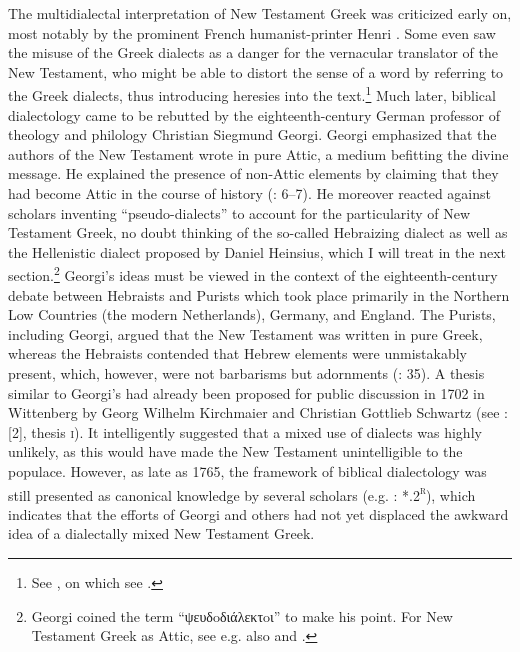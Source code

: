 The multidialectal interpretation of New Testament Greek was criticized early on, most notably by the prominent French humanist-printer Henri \citet[32–33, 138]{Estienne1581}. Some even saw the misuse of the Greek dialects as a danger for the vernacular translator of the New Testament, who might be able to distort the sense of a word by referring to the Greek dialects, thus introducing heresies into the text.\footnote{See \citet[429]{Rainolds1583}, on which see \citet[654--655]{VanRooyConsidine2016}.} Much later, biblical dialectology came to be rebutted by the eighteenth-century German professor of theology and philology Christian Siegmund Georgi. Georgi emphasized that the authors of the New Testament wrote in pure Attic, a medium befitting the divine message. He explained the presence of non-Attic elements by claiming that they had become Attic in the course of history (\citealt{Georgi1733}: 6–7). He moreover reacted against scholars inventing “pseudo-dialects” to account for the particularity of New Testament Greek, no doubt thinking of the so-called Hebraizing dialect as well as the Hellenistic dialect proposed by Daniel Heinsius, which I will treat in the next section.\footnote{Georgi coined the term “ψευδoδιάλεκτoι” to make his point. For New Testament Greek as Attic, see e.g. also \citet[3, 10--12]{Georgi1729} and \citet[b.7\textsc{\textsuperscript{r}}–b.8\textsc{\textsuperscript{v}}]{Fischer1754}.} Georgi’s ideas must be viewed in the context of the eighteenth-century debate between Hebraists and Purists which took place primarily in the Northern Low Countries (the modern Netherlands), Germany, and England. The Purists, including Georgi, argued that the New Testament was written in pure Greek, whereas the Hebraists contended that Hebrew elements were unmistakably present, which, however, were not barbarisms but adornments (: 35). A thesis similar to Georgi’s had already been proposed for public discussion in 1702 in Wittenberg by Georg Wilhelm Kirchmaier and Christian Gottlieb Schwartz (see \citealt{Kirchmaier1702}: [2], thesis \textsc{i}). It intelligently suggested that a mixed use of dialects was highly unlikely, as this would have made the New Testament unintelligible to the populace. However, as late as 1765, the framework of biblical dialectology was still presented as canonical knowledge by several scholars (e.g. \citealt{Gottleber1765}: *.2\textsc{\textsuperscript{r}}), which indicates that the efforts of Georgi and others had not yet displaced the awkward idea of a dialectally mixed New Testament Greek.

